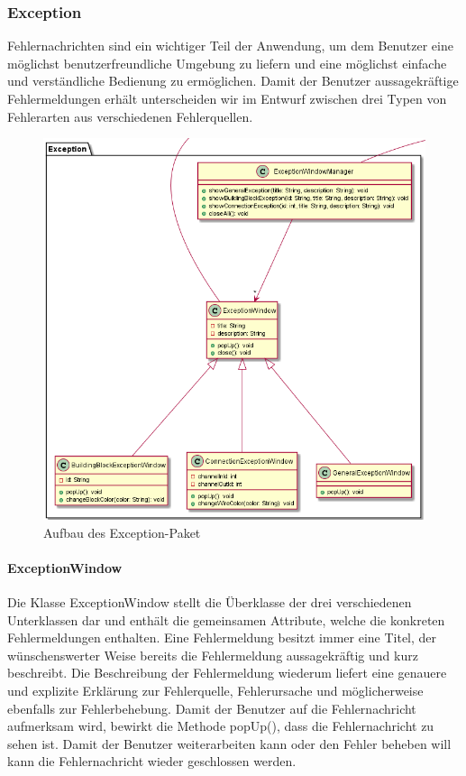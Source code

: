 \documentclass[parskip=full]{scrartcl}
\begin{document}
\subsubsection{Exception}

Fehlernachrichten sind ein wichtiger Teil der Anwendung, um dem Benutzer eine möglichst benutzerfreundliche Umgebung zu liefern und eine möglichst einfache und verständliche Bedienung zu ermöglichen. Damit der Benutzer aussagekräftige Fehlermeldungen erhält unterscheiden wir im Entwurf zwischen drei Typen von Fehlerarten aus verschiedenen Fehlerquellen.

\begin{figure}[htbp]
	\begin{center}
		\includegraphics[width = 14cm]{Grafiken/View/ExceptionNamespace.png}
		\caption{Aufbau des Exception-Paket}
		\label{Entwurf_Grob}
	\end{center}
\end{figure}

\paragraph{ExceptionWindow}

Die Klasse ExceptionWindow stellt die Überklasse der drei verschiedenen Unterklassen dar und enthält die gemeinsamen Attribute, welche die konkreten Fehlermeldungen enthalten. Eine Fehlermeldung besitzt immer eine Titel, der wünschenswerter Weise bereits die Fehlermeldung aussagekräftig und kurz beschreibt. Die Beschreibung der Fehlermeldung wiederum liefert eine genauere und explizite Erklärung zur Fehlerquelle, Fehlerursache und möglicherweise ebenfalls zur Fehlerbehebung.
Damit der Benutzer auf die Fehlernachricht aufmerksam wird, bewirkt die Methode popUp(), dass die Fehlernachricht zu sehen ist. Damit der Benutzer weiterarbeiten kann oder den Fehler beheben will kann die Fehlernachricht wieder geschlossen werden.
\end{document}
